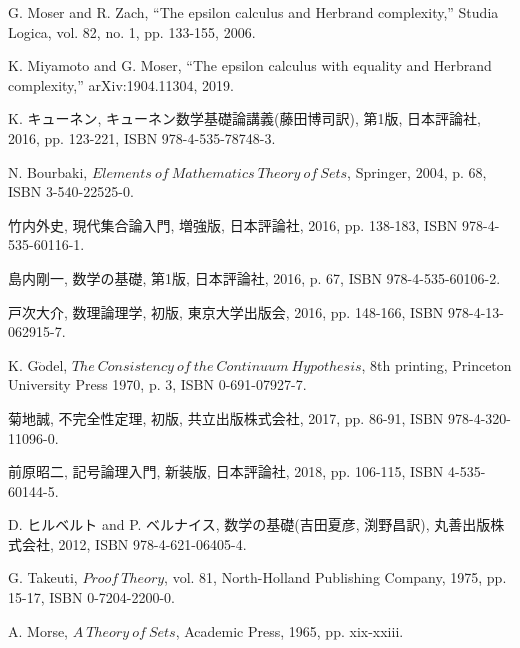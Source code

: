 \begin{thebibliography}{数字}
	 G. Moser and R. Zach, ``The epsilon calculus and Herbrand complexity,''
		Studia Logica, vol. 82, no. 1, pp. 133-155, 2006.
	
	 K. Miyamoto and G. Moser, ``The epsilon calculus with equality and Herbrand complexity,'' arXiv:1904.11304, 2019.
	
	 K. キューネン, キューネン数学基礎論講義(藤田博司訳), 第1版, 日本評論社, 2016, pp. 123-221, ISBN 978-4-535-78748-3. 
	
	 N. Bourbaki, $Elements\ of\ Mathematics\ Theory\ of\ Sets$, Springer, 2004, p. 68, ISBN 3-540-22525-0.
	
	 竹内外史, 現代集合論入門, 増強版, 日本評論社, 2016, pp. 138-183, ISBN 978-4-535-60116-1.
	
	 島内剛一, 数学の基礎, 第1版, 日本評論社, 2016, p. 67, ISBN 978-4-535-60106-2.
	
	 戸次大介, 数理論理学, 初版, 東京大学出版会, 2016, pp. 148-166, ISBN 978-4-13-062915-7.
	
	 K. G$\ddot{\mbox{o}}$del, $The\ Consistency\ of\ the\ Continuum\ Hypothesis$, 8th printing, Princeton University Press 1970, p. 3, ISBN 0-691-07927-7.
	
	 菊地誠, 不完全性定理, 初版, 共立出版株式会社, 2017, pp. 86-91, ISBN 978-4-320-11096-0.
	
	 前原昭二, 記号論理入門, 新装版, 日本評論社, 2018, pp. 106-115, ISBN 4-535-60144-5.
	
	 D. ヒルベルト and P. ベルナイス, 数学の基礎(吉田夏彦, 渕野昌訳), 丸善出版株式会社, 2012, ISBN 978-4-621-06405-4.
	
	 G. Takeuti, $Proof\ Theory$, vol. 81, North-Holland Publishing Company, 1975, pp. 15-17, ISBN 0-7204-2200-0. 
	
	 A. Morse, $A\ Theory\ of\ Sets$, Academic Press, 1965, pp. xix-xxiii.
\end{thebibliography}